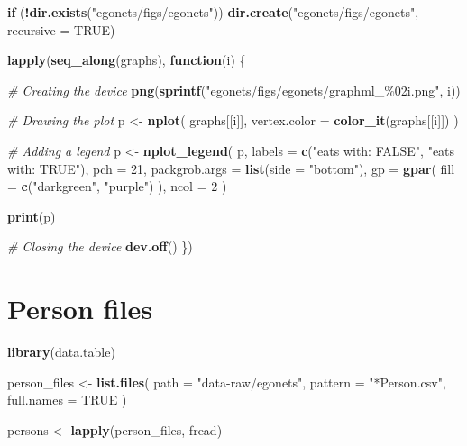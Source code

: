 \documentclass[
]{book}
\newenvironment{Shaded}{\begin{snugshade}}{\end{snugshade}}
\newcommand{\AttributeTok}[1]{\textcolor[rgb]{0.13,0.29,0.53}{#1}}
\newcommand{\CommentTok}[1]{\textcolor[rgb]{0.56,0.35,0.01}{\textit{#1}}}
\newcommand{\ConstantTok}[1]{\textcolor[rgb]{0.56,0.35,0.01}{#1}}
\newcommand{\ControlFlowTok}[1]{\textcolor[rgb]{0.13,0.29,0.53}{\textbf{#1}}}
\newcommand{\DecValTok}[1]{\textcolor[rgb]{0.00,0.00,0.81}{#1}}
\newcommand{\FunctionTok}[1]{\textcolor[rgb]{0.13,0.29,0.53}{\textbf{#1}}}
\newcommand{\NormalTok}[1]{#1}
\newcommand{\OtherTok}[1]{\textcolor[rgb]{0.56,0.35,0.01}{#1}}
\newcommand{\SpecialCharTok}[1]{\textcolor[rgb]{0.81,0.36,0.00}{\textbf{#1}}}
\newcommand{\StringTok}[1]{\textcolor[rgb]{0.31,0.60,0.02}{#1}}
\begin{document}
\begin{Shaded}
\begin{Highlighting}[]
\ControlFlowTok{if}\NormalTok{ (}\SpecialCharTok{!}\FunctionTok{dir.exists}\NormalTok{(}\StringTok{"egonets/figs/egonets"}\NormalTok{))}
  \FunctionTok{dir.create}\NormalTok{(}\StringTok{"egonets/figs/egonets"}\NormalTok{, }\AttributeTok{recursive =} \ConstantTok{TRUE}\NormalTok{)}

\FunctionTok{lapply}\NormalTok{(}\FunctionTok{seq\_along}\NormalTok{(graphs), }\ControlFlowTok{function}\NormalTok{(i) \{}
  
  \CommentTok{\# Creating the device }
  \FunctionTok{png}\NormalTok{(}\FunctionTok{sprintf}\NormalTok{(}\StringTok{"egonets/figs/egonets/graphml\_\%02i.png"}\NormalTok{, i))  }
  
  \CommentTok{\# Drawing the plot}
\NormalTok{  p }\OtherTok{\textless{}{-}} \FunctionTok{nplot}\NormalTok{(}
\NormalTok{    graphs[[i]],}
    \AttributeTok{vertex.color =} \FunctionTok{color\_it}\NormalTok{(graphs[[i]])}
\NormalTok{    )}
  
  \CommentTok{\# Adding a legend}
\NormalTok{  p }\OtherTok{\textless{}{-}} \FunctionTok{nplot\_legend}\NormalTok{(}
\NormalTok{    p,}
    \AttributeTok{labels =} \FunctionTok{c}\NormalTok{(}\StringTok{"eats with: FALSE"}\NormalTok{, }\StringTok{"eats with: TRUE"}\NormalTok{),}
    \AttributeTok{pch    =} \DecValTok{21}\NormalTok{,}
    \AttributeTok{packgrob.args =} \FunctionTok{list}\NormalTok{(}\AttributeTok{side =} \StringTok{"bottom"}\NormalTok{),}
    \AttributeTok{gp            =} \FunctionTok{gpar}\NormalTok{(}
      \AttributeTok{fill =} \FunctionTok{c}\NormalTok{(}\StringTok{"darkgreen"}\NormalTok{, }\StringTok{"purple"}\NormalTok{)}
\NormalTok{    ),}
    \AttributeTok{ncol =} \DecValTok{2}
\NormalTok{  )}
  
  \FunctionTok{print}\NormalTok{(p)}
  
  \CommentTok{\# Closing the device}
  \FunctionTok{dev.off}\NormalTok{()}
\NormalTok{\})}
\end{Highlighting}
\end{Shaded}

\hypertarget{person-files}{%
\section{Person files}\label{person-files}}

\begin{Shaded}
\begin{Highlighting}[]
\FunctionTok{library}\NormalTok{(data.table)}

\NormalTok{person\_files }\OtherTok{\textless{}{-}} \FunctionTok{list.files}\NormalTok{(}
  \AttributeTok{path       =} \StringTok{"data{-}raw/egonets"}\NormalTok{,}
  \AttributeTok{pattern    =} \StringTok{"*Person.csv"}\NormalTok{,}
  \AttributeTok{full.names =} \ConstantTok{TRUE}
\NormalTok{  )}

\NormalTok{persons }\OtherTok{\textless{}{-}} \FunctionTok{lapply}\NormalTok{(person\_files, fread)}
\end{Highlighting}
\end{Shaded}
\end{document}
